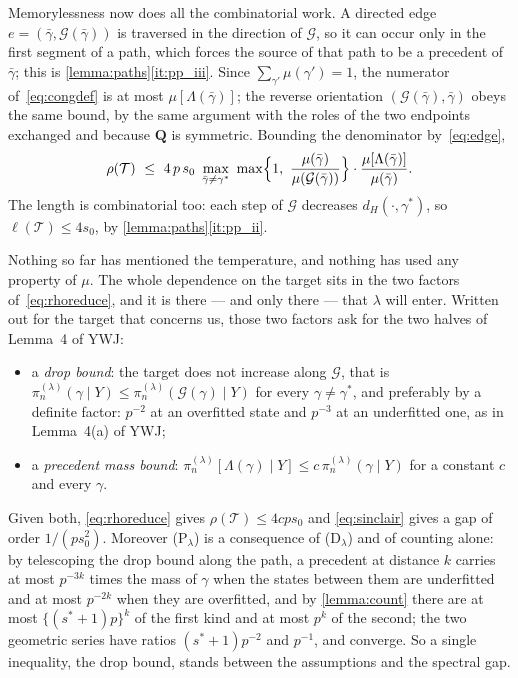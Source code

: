 \documentclass[aos]{imsart}
\theoremstyle{plain}
\theoremstyle{definition}
\begin{document}
    Memorylessness now does all the combinatorial work. A directed edge
    $e=(\bar\gamma,\mathcal{G}(\bar\gamma))$ is traversed in the direction
    of $\mathcal{G}$, so it can occur only in the first segment of a path,
    which forces the source of that path to be a precedent of $\bar\gamma$;
    this is \cref{lemma:paths}\ref{it:pp_iii}. Since
    $\sum_{\gamma'}\mu(\gamma')=1$, the numerator of~\eqref{eq:congdef} is
    at most $\mu[\Lambda(\bar\gamma)]$; the reverse orientation
    $(\mathcal{G}(\bar\gamma),\bar\gamma)$ obeys the same bound, by the
    same argument with the roles of the two endpoints exchanged and because
    $\mathbf{Q}$ is symmetric. Bounding the denominator
    by~\eqref{eq:edge},
    \begin{equation}
        \label{eq:rhoreduce}
        \rho(\mathcal{T})\ \leq\ 4\,p\,s_0\
        \max_{\bar\gamma\neq\gamma^{\ast}}\
        \max\Bigl\{1,\
        \frac{\mu(\bar\gamma)}{\mu(\mathcal{G}(\bar\gamma))}\Bigr\}
        \cdot
        \frac{\mu[\Lambda(\bar\gamma)]}{\mu(\bar\gamma)} .
    \end{equation}
    The length is combinatorial too: each step of $\mathcal{G}$ decreases
    $d_H(\cdot,\gamma^{\ast})$, so $\ell(\mathcal{T})\leq4s_0$, by
    \cref{lemma:paths}\ref{it:pp_ii}.

    Nothing so far has mentioned the temperature, and nothing has used any
    property of $\mu$. The whole dependence on the target sits in the two
    factors of~\eqref{eq:rhoreduce}, and it is there --- and only there ---
    that $\lambda$ will enter. Written out for the target that concerns us,
    those two factors ask for the two halves of Lemma~4 of YWJ:
    \begin{itemize}[leftmargin=3.2em]
        \item[(D$_\lambda$)] a \emph{drop bound}: the target does not
        increase along $\mathcal{G}$, that is
        $\pi_n^{(\lambda)}(\gamma\mid Y)\leq
        \pi_n^{(\lambda)}(\mathcal{G}(\gamma)\mid Y)$ for every
        $\gamma\neq\gamma^{\ast}$, and preferably by a definite factor:
        $p^{-2}$ at an overfitted state and $p^{-3}$ at an underfitted one,
        as in Lemma~4(a) of YWJ;
        \item[(P$_\lambda$)] a \emph{precedent mass bound}:
        $\pi_n^{(\lambda)}[\Lambda(\gamma)\mid Y]\leq
        c\,\pi_n^{(\lambda)}(\gamma\mid Y)$ for a constant $c$ and every
        $\gamma$.
    \end{itemize}
    Given both, \eqref{eq:rhoreduce} gives $\rho(\mathcal{T})\leq4cps_0$ and
    \eqref{eq:sinclair} gives a gap of order $1/(ps_0^{2})$. Moreover
    (P$_\lambda$) is a consequence of (D$_\lambda$) and of counting alone: by
    telescoping the drop bound along the path, a precedent at distance $k$
    carries at most $p^{-3k}$ times the mass of $\gamma$ when the states
    between them are underfitted and at most $p^{-2k}$ when they are
    overfitted, and by \cref{lemma:count} there are at most
    $\{(s^{\ast}+1)p\}^{k}$ of the first kind and at most $p^{k}$ of the
    second; the two geometric series have ratios $(s^{\ast}+1)p^{-2}$ and
    $p^{-1}$, and converge. So
    a single inequality, the drop bound, stands between the assumptions and
    the spectral gap.
\end{document}
